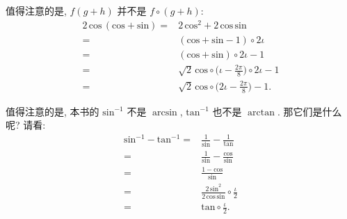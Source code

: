 \begin{example}
    值得注意的是, $f(g + h)$ 并不是 $f \circ (g + h)$:
    \begin{align*}
        2\,\mathrm{cos} \,(\mathrm{cos} + \mathrm{sin})
        = {} & 2\,\mathrm{cos}^2 + 2 \,\mathrm{cos} \,\mathrm{sin}                                \\
        = {} & (\mathrm{cos} + \mathrm{sin} - 1) \circ {2\iota}                                   \\
        = {} & (\mathrm{cos} + \mathrm{sin}) \circ {2\iota} - 1                                   \\
        = {} & \sqrt{2}\,\mathrm{cos} \circ \bigg( \iota - \frac{2\pi}{8} \bigg) \circ 2\iota - 1 \\
        = {} & \sqrt{2}\,\mathrm{cos} \circ \bigg( 2\iota - \frac{2\pi}{8} \bigg) - 1.
    \end{align*}
\end{example}

\begin{example}
    值得注意的是, 本书的 $\mathrm{sin}^{-1}$ 不是 $\arcsin$, $\mathrm{tan}^{-1}$ 也不是 $\arctan$. 那它们是什么呢? 请看:
    \begin{align*}
        \mathrm{sin}^{-1} - \mathrm{tan}^{-1}
        = {} & \frac{1}{\mathrm{sin}} - \frac{1}{\mathrm{tan}}                                  \\
        = {} & \frac{1}{\mathrm{sin}} - \frac{\mathrm{cos}}{\mathrm{sin}}                       \\
        = {} & \frac{1 - \mathrm{cos}}{\mathrm{sin}}                                            \\
        = {} & \frac{2\, \mathrm{sin}^2}{2\, \mathrm{cos}\, \mathrm{sin}} \circ \frac{\iota}{2} \\
        = {} & \mathrm{tan} \circ \frac{\iota}{2}.
    \end{align*}
\end{example}

